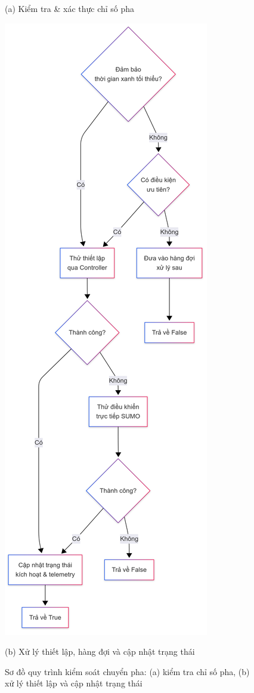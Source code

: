 \begin{figure}[htbp]
\begin{minipage}[t]{0.48\textwidth}
        \caption*{(a) Kiểm tra \& xác thực chỉ số pha}
    \end{minipage}
    \hfill
    \begin{minipage}[t]{0.48\textwidth}
        \centering
        \includegraphics[width=0.9\linewidth]{Untitled diagram _ Mermaid Chart-2025-08-22-064805.png}
        \caption*{(b) Xử lý thiết lập, hàng đợi và cập nhật trạng thái}
    \end{minipage}
    \caption{Sơ đồ quy trình kiểm soát chuyển pha: (a) kiểm tra chỉ số pha, (b) xử lý thiết lập và cập nhật trạng thái}
    \label{fig:phase_control_pair}
\end{figure}

